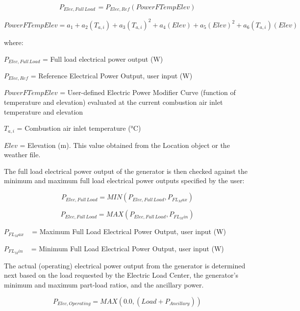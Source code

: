 \begin{equation}
{P_{Elec,Full\,Load\,}} = {P_{Elec,Ref}}\left( {PowerFTempElev} \right)
\end{equation}

\begin{equation}
PowerFTempElev = {a_1} + {a_2}\left( {{T_{a,i}}} \right) + {a_3}{\left( {{T_{a,i}}} \right)^2} + {a_4}\left( {Elev} \right) + {a_5}{\left( {Elev} \right)^2} + {a_6}\left( {{T_{a,i}}} \right)\left( {Elev} \right)
\end{equation}

where:

\({P_{Elec,Full\,Load}}\) = Full load electrical power output (W)

\({P_{Elec,Ref}}\) = Reference Electrical Power Output, user input (W)

\(PowerFTempElev\) = User-defined Electric Power Modifier Curve (function of temperature and elevation) evaluated at the current combustion air inlet temperature and elevation

\({T_{a,i}}\) = Combustion air inlet temperature (°C)

\(Elev\) = Elevation (m). This value obtained from the Location object or the weather file.

The full load electrical power output of the generator is then checked against the minimum and maximum full load electrical power outputs specified by the user:

\begin{equation}
{P_{Elec,Full\,Load}} = MIN\left( {{P_{Elec,Full\,Load}},{P_{FL_Max}}} \right)
\end{equation}

\begin{equation}
{P_{Elec,Full\,Load}} = MAX\left( {{P_{Elec,Full\,Load}},{P_{FL_Min}}} \right)
\end{equation}

\({P_{FL_Max}}\) ~ = Maximum Full Load Electrical Power Output, user input (W)

\({P_{FL_Min}}\) ~ = Minimum Full Load Electrical Power Output, user input (W)

The actual (operating) electrical power output from the generator is determined next based on the load requested by the Electric Load Center, the generator's minimum and maximum part-load ratios, and the ancillary power.

\begin{equation}
{P_{Elec,Operating}} = MAX\left( {0.0,\left( {Load + {P_{Ancillary}}} \right)} \right)
\end{equation}

